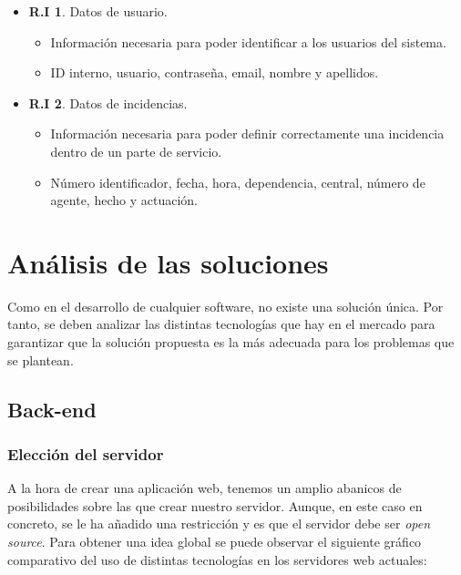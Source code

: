 \begin{itemize}
	\item \textbf{R.I 1}. Datos de usuario.
	\begin{itemize}
		\item Información necesaria para poder identificar a los usuarios del sistema.
		\item ID interno, usuario, contraseña, email, nombre y apellidos.
	\end{itemize}

	\item \textbf{R.I 2}. Datos de incidencias.
	\begin{itemize}
		\item Información necesaria para poder definir correctamente una incidencia dentro de un parte de servicio.
		\item Número identificador, fecha, hora, dependencia, central, número de agente, hecho y actuación.
	\end{itemize}
\end{itemize}

\section{Análisis de las soluciones}

Como en el desarrollo de cualquier software, no existe una solución única. Por tanto, se deben analizar las
distintas tecnologías que hay en el mercado para garantizar que la solución propuesta es la más adecuada para
los problemas que se plantean.

\subsection{Back-end}

\subsubsection{Elección del servidor} 
A la hora de crear una aplicación web, tenemos un amplio abanicos de posibilidades sobre las que crear nuestro servidor. Aunque, en este caso
en concreto, se le ha añadido una restricción y es que el servidor debe ser \textit{open source}. Para obtener
una idea global se puede observar el siguiente gráfico comparativo del uso de distintas tecnologías en los servidores web actuales:

